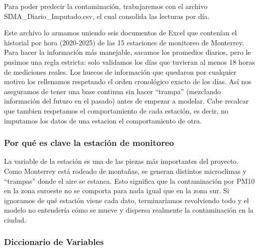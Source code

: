 \documentclass[
  11pt,
  letterpaper,
]{article}
\begin{document}
Para poder predecir la contaminación, trabajaremos con el archivo
SIMA\_Diario\_Imputado.csv, el cual consolida las lecturas por día.

Este archivo lo armamos uniendo seis documentos de Excel que contenían
el historial por hora (2020-2025) de las 15 estaciones de monitoreo de
Monterrey. Para hacer la información más manejable, sacamos los
promedios diarios, pero le pusimos una regla estricta: solo validamos
los días que tuvieran al menos 18 horas de mediciones reales. Los huecos
de información que quedaron por cualquier motivo los rellenamos
respetando el orden cronológico exacto de los días. Así nos aseguramos
de tener una base continua sin hacer ``trampa'' (mezclando información
del futuro en el pasado) antes de empezar a modelar. Cabe recalcar que
tambien respetamos el comportamiento de cada estación, es decir, no
imputamos los datos de una estacion el comportamiento de otra.

\subsubsection{Por qué es clave la estación de
monitoreo}\label{por-quuxe9-es-clave-la-estaciuxf3n-de-monitoreo}

La variable de la estación es una de las piezas más importantes del
proyecto. Como Monterrey está rodeado de montañas, se generan distintos
microclimas y ``trampas'' donde el aire se estanca. Esto significa que
la contaminación por PM10 en la zona suroeste no se comporta para nada
igual que en la zona sur. Si ignoramos de qué estación viene cada dato,
terminaríamos revolviendo todo y el modelo no entendería cómo se mueve y
dispersa realmente la contaminación en la ciudad.

\subsubsection{Diccionario de Variables}\label{diccionario-de-variables}
\end{document}
